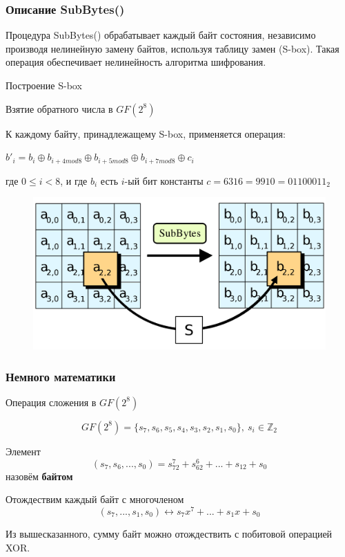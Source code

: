 \documentclass[10pt, typeface=serif(roman), pdf,hyperref={unicode}, aspectratio=169]{beamer}
\begin{document}
\begin{frame}
	\frametitle{Описание SubBytes()}
	Процедура SubBytes() обрабатывает каждый байт состояния, независимо производя нелинейную замену байтов, используя таблицу замен (S-box). Такая операция обеспечивает нелинейность алгоритма шифрования.
	\begin{enumerate}
		\begin{figure}
			\includegraphics[scale=0.075]{S-box.png}	
		\end{figure}
	\end{enumerate}
\end{frame}



\begin{frame}
	\frametitle{Немного математики}
	\begin{block}
		{
			Операция сложения в \(GF(2^8)\)
		}
		\begin{description}
			\item \[ GF(2^8) = \{s_7,s_6,s_5,s_4,s_3,s_2,s_1,s_0\}, ~s_i \in \mathbb{Z}_2\]
			\item Элемент \[ (s_7,s_6,...,s_0) = s_72^7 + s_62^6 + ... + s_12 + s_0 \] назовём \textbf{байтом }
			\item Отождествим каждый байт с многочленом \[ (s_7,...,s_1,s_0) \leftrightarrow s_7x^7 + ... + s_1x + s_0 \]
		\end{description}
	\end{block}
	Из вышесказанного, сумму байт можно отождествить с побитовой операцией XOR.
\end{frame}
\end{document}
